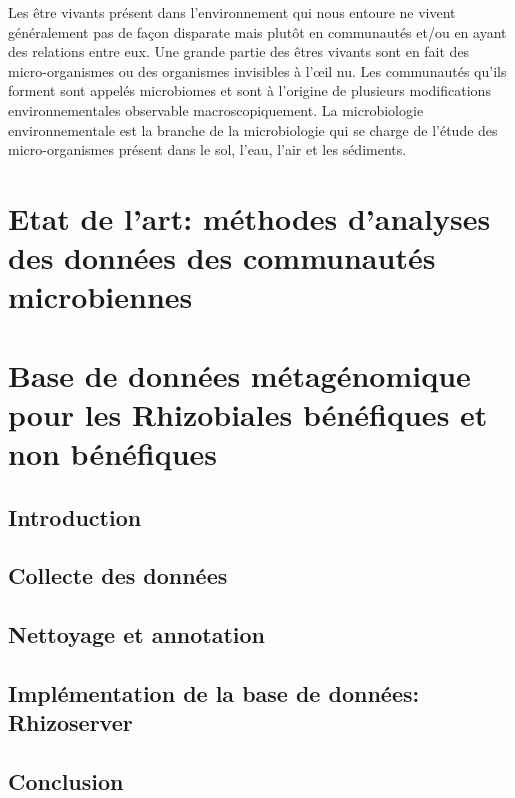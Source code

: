 \documentclass[12pt,twoside]{reedthesis}
\begin{document}
Les être vivants présent dans l'environnement qui nous entoure ne vivent généralement pas de façon disparate mais plutôt en communautés et/ou en ayant des relations entre eux. Une grande partie des êtres vivants sont en fait des micro-organismes ou des organismes invisibles à l'œil nu. Les communautés qu'ils forment sont appelés microbiomes et sont à l'origine de plusieurs modifications environnementales observable macroscopiquement.
La microbiologie environnementale est la branche de la microbiologie qui se charge de l'étude des micro-organismes présent dans le sol, l'eau, l'air et les sédiments.

\hypertarget{state-art}{%
\chapter{Etat de l'art: méthodes d'analyses des données des communautés microbiennes}\label{state-art}}

\hypertarget{database}{%
\chapter{Base de données métagénomique pour les Rhizobiales bénéfiques et non bénéfiques}\label{database}}

\hypertarget{introduction-1}{%
\section{Introduction}\label{introduction-1}}

\hypertarget{collecte-des-donnuxe9es}{%
\section{Collecte des données}\label{collecte-des-donnuxe9es}}

\hypertarget{nettoyage-et-annotation}{%
\section{Nettoyage et annotation}\label{nettoyage-et-annotation}}

\hypertarget{impluxe9mentation-de-la-base-de-donnuxe9es-rhizoserver}{%
\section{Implémentation de la base de données: Rhizoserver}\label{impluxe9mentation-de-la-base-de-donnuxe9es-rhizoserver}}

\hypertarget{conclusion}{%
\section{Conclusion}\label{conclusion}}
\end{document}
